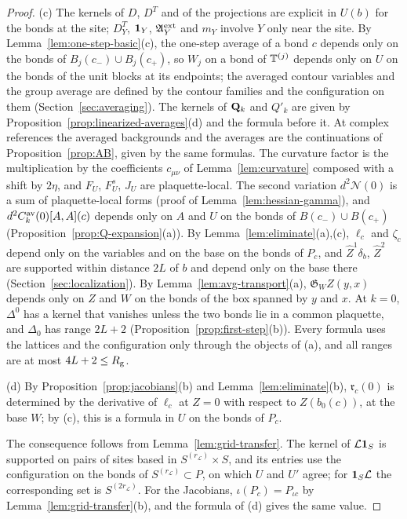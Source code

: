 \begin{proof}
(c) The kernels of $D$, $D^T$ and of the projections are explicit in $U(b)$ for the bonds at the site; $D^T_Y$, $\mathbf 1_Y$, $\mathfrak A^{\rm ext}_Y$ and $m_Y$ involve $Y$ only near the site. By Lemma~\ref{lem:one-step-basic}(c), the one-step average of a bond $c$ depends only on the bonds of $B_j(c_-)\cup B_j(c_+)$, so $W_j$ on a bond of $\mathbb T^{(j)}$ depends only on $U$ on the bonds of the unit blocks at its endpoints; the averaged contour variables and the group average are defined by the contour families and the configuration on them (Section~\ref{sec:averaging}). The kernels of $\mathbf Q_k$ and $Q'_k$ are given by Proposition~\ref{prop:linearized-averages}(d) and the formula before it. At complex references the averaged backgrounds and the averages are the continuations of Proposition~\ref{prop:AB}, given by the same formulas. The curvature factor is the multiplication by the coefficients $c_{\mu\nu}$ of Lemma~\ref{lem:curvature} composed with a shift by $2\eta$, and $F_U$, $F^s_U$, $J_U$ are plaquette-local. The second variation $d^2\mathcal N(0)$ is a sum of plaquette-local forms (proof of Lemma~\ref{lem:hessian-gamma}), and $d^2C^{\rm av}_k(0)[A,A](c)$ depends only on $A$ and $U$ on the bonds of $B(c_-)\cup B(c_+)$ (Proposition~\ref{prop:Q-expansion}(a)). By Lemma~\ref{lem:eliminate}(a),(c), $\ell_c$ and $\zeta_c$ depend only on the variables and on the base on the bonds of $P_c$, and $\hat Z^1\delta_b$, $\hat Z^2$ are supported within distance $2L$ of $b$ and depend only on the base there (Section~\ref{sec:localization}). By Lemma~\ref{lem:avg-transport}(a), $\mathfrak G_WZ(y,x)$ depends only on $Z$ and $W$ on the bonds of the box spanned by $y$ and $x$. At $k=0$, $\Delta^0$ has a kernel that vanishes unless the two bonds lie in a common plaquette, and $\Delta_0$ has range $2L+2$ (Proposition~\ref{prop:first-step}(b)). Every formula uses the lattices and the configuration only through the objects of (a), and all ranges are at most $4L+2\le R_{\rm g}$.

(d) By Proposition~\ref{prop:jacobians}(b) and Lemma~\ref{lem:eliminate}(b), $\mathfrak r_c(0)$ is determined by the derivative of $\ell_c$ at $Z=0$ with respect to $Z(b_0(c))$, at the base $W$; by (c), this is a formula in $U$ on the bonds of $P_c$.

The consequence follows from Lemma~\ref{lem:grid-transfer}. The kernel of $\mathcal L\mathbf 1_S$ is supported on pairs of sites based in $S^{(r_{\mathcal L})}\times S$, and its entries use the configuration on the bonds of $S^{(r_{\mathcal L})}\subset P$, on which $U$ and $U'$ agree; for $\mathbf 1_S\mathcal L$ the corresponding set is $S^{(2r_{\mathcal L})}$. For the Jacobians, $\iota(P_c)=P_{\iota c}$ by Lemma~\ref{lem:grid-transfer}(b), and the formula of (d) gives the same value.
\end{proof}


